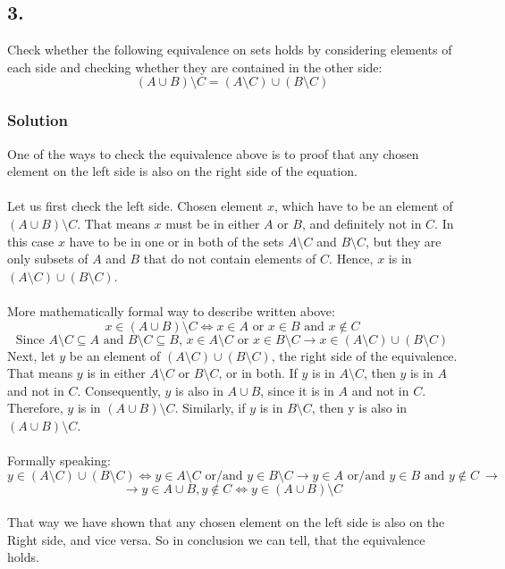 \documentclass[a4paper]{article}
\newcommand{\lrl}[1]{\({#1}\)}
\begin{document}
\subsection*{3.}
Check whether the following equivalence on sets holds by considering elements of each side and checking whether they are contained in the other side:
\[(A \cup B) \setminus C = (A \setminus C) \cup (B \setminus C)\]
\subsubsection*{Solution}
One of the ways to check the equivalence above is to proof that any chosen element on the left side is also on the right side of the equation.\\ \\
Let us first check the left side. Chosen element \(x\), which have to be an element of \((A \cup B) \setminus C\). That means \(x\) must be in either \lrl{A} or \lrl{B}, and definitely not in \lrl{C}. In this case \lrl{x} have to be in one or in both of the sets \lrl{A \setminus C} and \lrl{B \setminus C}, but they are only subsets of \lrl{A} and \lrl{B} that do not contain elements of \lrl{C}. Hence, \lrl{x} is in \lrl{(A \setminus C) \cup (B \setminus C)}. \\ \\
More mathematically formal way to describe written above:
\[x \in (A \cup B) \setminus C \Leftrightarrow x \in A \text{ or } x \in B \text{ and } x \notin C\] 
\[\text{Since } A \setminus C  \subseteq A \text{ and } B \setminus C \subseteq B \text{, } x \in A \setminus C \text{ or } x \in B \setminus C \rightarrow x \in (A \setminus C) \cup (B \setminus C)\]
Next, let \lrl{y} be an element of \lrl{(A \setminus C) \cup (B \setminus C)}, the right side of the equivalence. That means \lrl{y} is in either \lrl{A \setminus C} or \lrl{B \setminus C}, or in both. If \lrl{y} is in \lrl{A \setminus C}, then \lrl{y} is in \lrl{A} and not in \lrl{C}. Consequently, \lrl{y} is also in \lrl{A \cup B}, since it is in \lrl{A} and not in \lrl{C}. Therefore, \lrl{y} is in \lrl{(A \cup B) \setminus C}. Similarly, if \lrl{y} is in \lrl{B \setminus C}, then y is also in \lrl{(A \cup B) \setminus C}. \\ \\
Formally speaking:
\[y \in (A \setminus C) \cup (B \setminus C) \Leftrightarrow y \in A \setminus C \text{ or/and } y \in B \setminus C \rightarrow y \in A \text{ or/and } y \in B \text{ and } y \notin C\ \rightarrow \] 
\[\rightarrow y \in A \cup B, y \notin C \Leftrightarrow y \in (A \cup B) \setminus C\]
\\
That way we have shown that any chosen element on the left side is also on the Right side, and vice versa. So in conclusion we can tell, that the equivalence holds.
\end{document}
